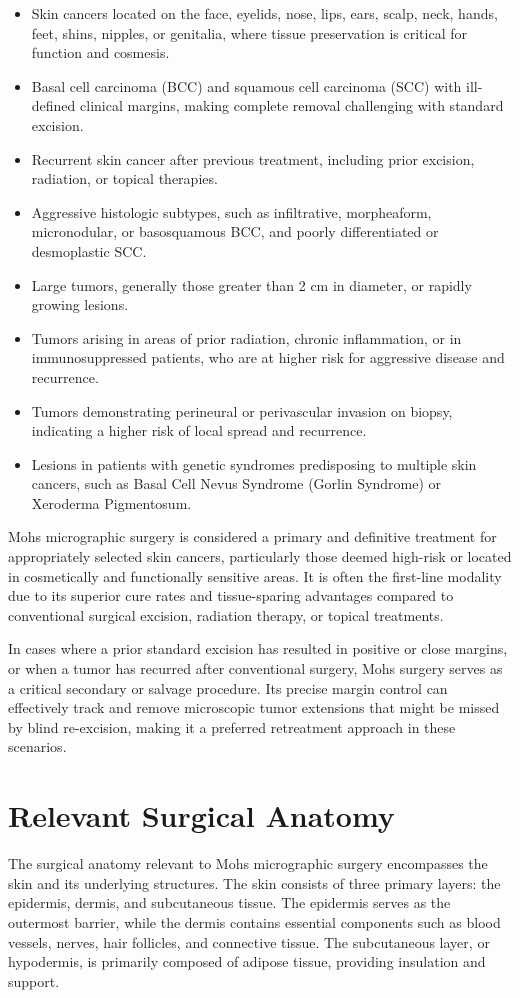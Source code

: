 \begin{itemize}
  \item Skin cancers located on the face, eyelids, nose, lips, ears, scalp, neck, hands, feet, shins, nipples, or genitalia, where tissue preservation is critical for function and cosmesis.
  \item Basal cell carcinoma (BCC) and squamous cell carcinoma (SCC) with ill-defined clinical margins, making complete removal challenging with standard excision.
  \item Recurrent skin cancer after previous treatment, including prior excision, radiation, or topical therapies.
  \item Aggressive histologic subtypes, such as infiltrative, morpheaform, micronodular, or basosquamous BCC, and poorly differentiated or desmoplastic SCC.
  \item Large tumors, generally those greater than 2 cm in diameter, or rapidly growing lesions.
  \item Tumors arising in areas of prior radiation, chronic inflammation, or in immunosuppressed patients, who are at higher risk for aggressive disease and recurrence.
  \item Tumors demonstrating perineural or perivascular invasion on biopsy, indicating a higher risk of local spread and recurrence.
  \item Lesions in patients with genetic syndromes predisposing to multiple skin cancers, such as Basal Cell Nevus Syndrome (Gorlin Syndrome) or Xeroderma Pigmentosum.
\end{itemize}

Mohs micrographic surgery is considered a primary and definitive treatment for appropriately selected skin cancers, particularly those deemed high-risk or located in cosmetically and functionally sensitive areas. It is often the first-line modality due to its superior cure rates and tissue-sparing advantages compared to conventional surgical excision, radiation therapy, or topical treatments. 

In cases where a prior standard excision has resulted in positive or close margins, or when a tumor has recurred after conventional surgery, Mohs surgery serves as a critical secondary or salvage procedure. Its precise margin control can effectively track and remove microscopic tumor extensions that might be missed by blind re-excision, making it a preferred retreatment approach in these scenarios.

\section*{Relevant Surgical Anatomy}
The surgical anatomy relevant to Mohs micrographic surgery encompasses the skin and its underlying structures. The skin consists of three primary layers: the epidermis, dermis, and subcutaneous tissue. The epidermis serves as the outermost barrier, while the dermis contains essential components such as blood vessels, nerves, hair follicles, and connective tissue. The subcutaneous layer, or hypodermis, is primarily composed of adipose tissue, providing insulation and support.

